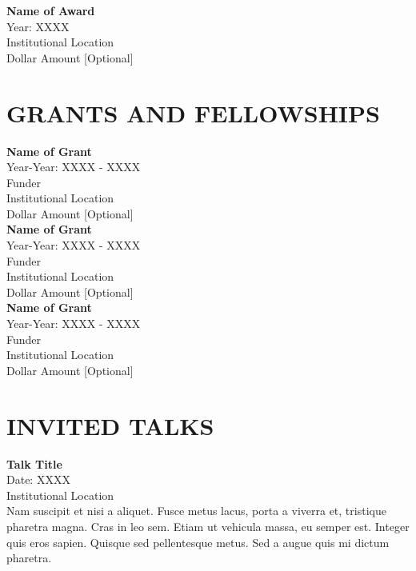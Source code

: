\documentclass[a4paper,9pt]{extarticle}
\begin{document}
\noindent
\textbf{Name of Award} \\
Year: XXXX \\
Institutional Location \\
Dollar Amount [Optional]  


\section*{GRANTS AND FELLOWSHIPS}

\noindent
\newline 
\textbf{Name of Grant} \\
Year-Year: XXXX - XXXX\\
Funder \\
Institutional Location \\
Dollar Amount [Optional]  \\

\noindent
\textbf{Name of Grant} \\ 
Year-Year: XXXX - XXXX\\
Funder \\
Institutional Location \\
Dollar Amount [Optional]  \\

\noindent
\textbf{Name of Grant} \\ 
Year-Year: XXXX - XXXX\\
Funder \\
Institutional Location \\
Dollar Amount [Optional]  


\section*{INVITED TALKS}

\noindent
\newline 
\textbf{Talk Title} \\ 
Date: XXXX \\
Institutional Location \\
Nam suscipit et nisi a aliquet. Fusce metus lacus, porta a viverra et, tristique pharetra magna. Cras in leo sem. Etiam ut vehicula massa, eu semper est. Integer quis eros sapien. Quisque sed pellentesque metus. Sed a augue quis mi dictum pharetra. \\
\end{document}
